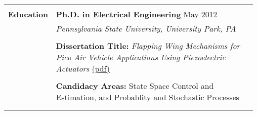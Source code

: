 \begin{tabular}{L{\hlcolw}  L{\rcolw}}
    \\ 
    \hline  
    \hline   
    \\
\textbf{\Large Education} & \textbf{\large Ph.D. in Electrical Engineering} \hfill {\large May 2012} 
\vspace{0.05in} \\ 
& {\it\large Pennsylvania State University, University Park, PA} \\ \\
&  \textbf{Dissertation Title:} \textit{Flapping Wing Mechanisms for Pico Air Vehicle Applications Using Piezoelectric Actuators}
\href{http://www.mne.psu.edu/mrl/theses/mateti.pdf}{(pdf)} 
\\
\\
&  \textbf{Candidacy Areas:} State Space Control and Estimation, and Probablity and Stochastic Processes
\\
\\
&
\vspace{-0.2in} 

 
\end{tabular}